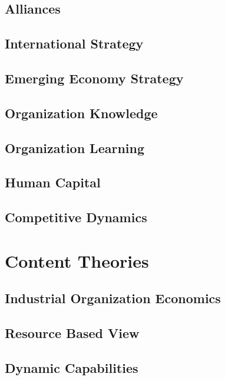 \documentclass[12pt,letterpaper]{article}
\begin{document}
\subsection{Alliances}

\subsection{International Strategy}

\subsection{Emerging Economy Strategy}

\subsection{Organization Knowledge}

\subsection{Organization Learning}

\subsection{Human Capital}

\subsection{Competitive Dynamics}

\newpage

\section{Content Theories}
\subsection{Industrial Organization Economics}

\subsection{Resource Based View}

\subsection{Dynamic Capabilities}
\end{document}
